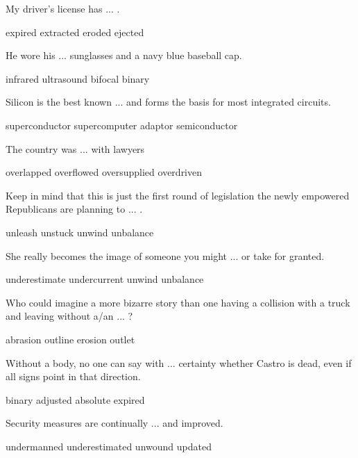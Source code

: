 \documentclass{exam}
\begin{document}
\begin{questions}
\question My driver's license has ... .\\
\begin{oneparchoices} 
\correctchoice expired
 \choice extracted 
 \choice eroded
 \choice ejected
\end{oneparchoices}
\question He wore his ... sunglasses and a navy blue baseball cap.\\
\begin{oneparchoices} 
\choice infrared
 \choice ultrasound
\correctchoice bifocal
 \choice binary 
\end{oneparchoices}
\question Silicon is the best known ... and forms the basis for most integrated circuits.\\
\begin{oneparchoices} 
\choice superconductor
\choice supercomputer
\choice adaptor
\correctchoice semiconductor
\end{oneparchoices}
\question The country was ... with lawyers\\
\begin{oneparchoices} 
\choice overlapped
\choice overflowed
\correctchoice oversupplied 
\choice overdriven
\end{oneparchoices}
\question Keep in mind that this is just the first round of legislation the newly empowered Republicans are planning to ... .\\
\begin{oneparchoices} 
\correctchoice unleash
\choice unstuck
\choice unwind
\choice unbalance 
\end{oneparchoices}
\question She really becomes the image of someone you might ... or take for granted.\\
\begin{oneparchoices} 
\correctchoice underestimate
\choice undercurrent
\choice unwind
\choice unbalance
\end{oneparchoices}
\question Who could imagine a more bizarre story than one having a collision with a truck and leaving without a/an ... ?\\
\begin{oneparchoices} 
\correctchoice abrasion
\choice outline
\choice erosion
\choice outlet 
\end{oneparchoices}

\question Without a body, no one can say with ... certainty whether Castro is dead, even if all signs point in that direction.\\
\begin{oneparchoices}
\choice binary
\choice adjusted
\correctchoice absolute
\choice expired 
\end{oneparchoices}
\question Security measures are continually ... and improved.\\
\begin{oneparchoices}
\choice undermanned
\choice underestimated
\choice unwound
\correctchoice updated
\end{oneparchoices}


\end{questions}
\end{document}
